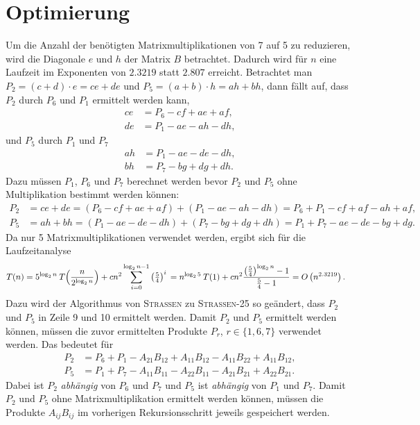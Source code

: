 \documentclass{scrartcl}
\numberwithin{equation}{section}
\begin{document}
\section{Optimierung}
Um die Anzahl der benötigten Matrixmultiplikationen von 7 auf 5 zu reduzieren, wird die Diagonale $e$ und $h$ der Matrix $B$ betrachtet. Dadurch wird für $n$ eine Laufzeit im Exponenten von $2.3219$ statt $2.807$ erreicht. Betrachtet man $P_2 = (c + d) \cdot e = ce + de$ und $P_5 = (a + b) \cdot h = ah + bh$, dann fällt auf, dass $P_2$ durch $P_6$ und $P_1$ ermittelt werden kann,
\begin{align*}
	ce &= P_6 - cf + ae + af, \\
	de &= P_1 - ae - ah - dh,
\end{align*}
und $P_5$ durch $P_1$ und $P_7$
\begin{align*}
	ah &= P_1 - ae - de - dh, \\
	bh &= P_7 - bg + dg + dh.
\end{align*}
Dazu müssen $P_1$, $P_6$ und $P_7$ berechnet werden bevor $P_2$ und $P_5$ ohne Multiplikation bestimmt werden können:
\begin{align*}
	P_2 &= ce + de = (P_6 - cf + ae + af) + (P_1 - ae - ah - dh) = P_6 + P_1 - cf + af - ah + af, \\
	P_5 &= ah + bh = (P_1 - ae - de - dh) + (P_7 - bg + dg + dh) = P_1 + P_7 - ae - de - bg + dg.
\end{align*}
Da nur 5 Matrixmultiplikationen verwendet werden, ergibt sich für die Laufzeitanalyse 
\begin{align*}
	\vphantom{\rule{0pt}{2.5ex}} T(n) &= 5^{\log_{2}n} \: T\Big(\frac{n}{2^{\log_{2}n}}\Big) + cn^2 \sum_{i = 0}^{\log_{2}n-1} \left(\tfrac{5}{4}\right)^i
	\vphantom{\rule{0pt}{2.5ex}} = n^{\log_{2}5} \: T(1) + cn^2 \frac{\left(\tfrac{5}{4}\right)^{\log_{2}n} - 1}{\tfrac{5}{4} - 1}
	\vphantom{\rule{0pt}{2.5ex}} = O\left(n^{2.3219}\right).
\end{align*}
Dazu wird der Algorithmus von \textsc{Strassen} zu \textsc{Strassen-25} so geändert, dass $P_2$ und $P_5$ in Zeile 9 und 10 ermittelt werden. Damit $P_2$ und $P_5$ ermittelt werden können, müssen die zuvor ermittelten Produkte $P_r$, $r \in \{1, 6, 7\}$ verwendet werden. Das bedeutet für 
\begin{align*}
	P_2 &= P_6 + P_1 - A_{21}B_{12} + A_{11}B_{12} - A_{11}B_{22} + A_{11}B_{12}, \\
	P_5 &= P_1 + P_7 - A_{11}B_{11} - A_{22}B_{11} - A_{21}B_{21} + A_{22}B_{21}.
\end{align*}
Dabei ist $P_2$ \textit{abhängig} von $P_6$ und $P_7$ und $P_5$ ist \textit{abhängig} von $P_1$ und $P_7$. Damit $P_2$ und $P_5$ ohne Matrixmultiplikation ermittelt werden können, müssen die Produkte $A_{ij}B_{ij}$ im vorherigen Rekursionsschritt jeweils gespeichert werden.
\end{document}
